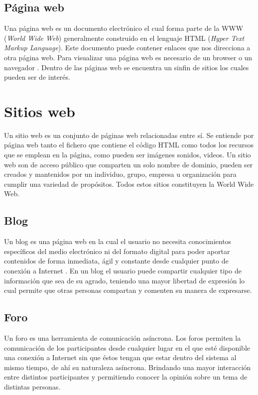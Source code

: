 \subsection{Página web}
Una página web es un documento electrónico el cual forma parte de la WWW (\textit{World Wide Web}) generalmente 
construido en el lenguaje HTML (\textit{Hyper Text Markup Language}). Este documento puede contener enlaces que nos 
direcciona a otra página web. Para visualizar una página web es necesario de un browser o un navegador \citep{CT16}. 
Dentro de las páginas web se encuentra un sinfin de sitios los cuales pueden ser de interés.

\section{Sitios web}
Un sitio web es un conjunto de páginas web relacionadas entre sí. Se entiende por página web tanto el fichero 
que contiene el código HTML como todos los recursos que se emplean en la página, como pueden ser
imágenes sonidos, videos.
Un sitio web son de acceso público que comparten un solo nombre de dominio, pueden ser creados y 
mantenidos por un individuo, grupo, empresa u organización para cumplir una variedad de propósitos. 
Todos estos sitios constituyen la World Wide Web. 


\subsection{Blog}
Un blog es una página web en la cual el usuario no necesita conocimientos específicos del medio electrónico ni del 
formato digital para poder aportar contenidos de forma inmediata, ágil y constante desde cualquier punto de conexión 
a Internet \citep{CT17}. En un blog el usuario puede compartir cualquier tipo de información que sea de su agrado, 
teniendo una mayor libertad de expresión lo cual permite que otras personas compartan y comenten su manera de expresarse.

\subsection{Foro}
Un foro es una herramienta de comunicación asíncrona. Los foros permiten la comunicación de los participantes desde 
cualquier lugar en el que  esté  disponible  una  conexión  a Internet  sin  que  éstos  tengan  que  estar dentro del 
sistema al mismo tiempo, de ahí su naturaleza asíncrona. Brindando una mayor interacción entre distintos 
participantes y permitiendo conocer la opinión sobre un tema de distintas personas.

